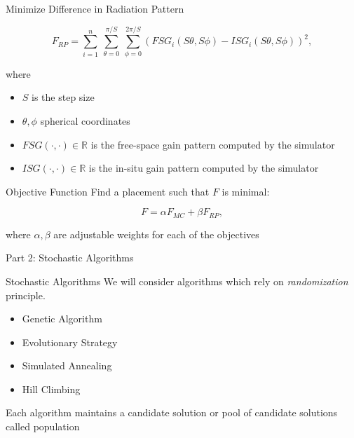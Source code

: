 \documentclass{beamer}
\begin{document}
\begin{frame}{Minimize Difference in Radiation Pattern}
    \begin{tcolorbox}[colback=green!5]
        \begin{equation} \label{eq:rp}
            F_{RP} = \sum_{i=1}^n~\sum_{\theta=0}^{\pi/S}~\sum_{\phi=0}^{2\pi/S}
            \left( FSG_i(S\theta,S\phi) - ISG_i(S\theta,S\phi) \right) ^2,
        \end{equation}
    \end{tcolorbox}
    where
    \begin{itemize}
            \small
        \item $S$ is the step size
        \item $\theta, \phi$ spherical coordinates
        \item $FSG(\cdot,\cdot) \in \mathbb R$ is the free-space gain pattern computed by the simulator
        \item $ISG(\cdot,\cdot) \in \mathbb R$ is the in-situ gain pattern computed by the simulator
    \end{itemize}
\end{frame}

\begin{frame}{Objective Function}
    Find a placement such that $F$ is minimal:
    \begin{tcolorbox}[colback=green!5]
        \begin{equation} \label{eq:optimal}
            F = \alpha F_{MC} + \beta F_{RP},
        \end{equation}
    \end{tcolorbox}
    where $\alpha, \beta$ are adjustable weights for each of the objectives 
\end{frame}

\begin{frame}{\null}
    \begin{tcolorbox}[colback=green!5]
        \centering\Huge
        Part 2: Stochastic Algorithms
    \end{tcolorbox}
\end{frame}

\begin{frame}[t]{Stochastic Algorithms}
    We will consider algorithms which rely on \textit{randomization} principle.
    \vspace{10px}
\begin{itemize} \itemsep1.5em
        \item Genetic Algorithm
        \item Evolutionary Strategy
        \item Simulated Annealing
        \item Hill Climbing
    \end{itemize}
    \vspace{5mm}
    Each algorithm maintains a candidate solution or pool of candidate solutions called population
\end{frame}
\end{document}
